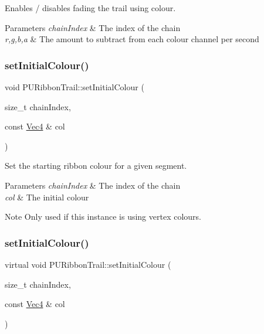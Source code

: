 Enables / disables fading the trail using colour. 
\begin{DoxyParams}{Parameters}
{\em chain\+Index} & The index of the chain \\
\hline
{\em r,g,b,a} & The amount to subtract from each colour channel per second \\
\hline
\end{DoxyParams}
\mbox{\label{classPURibbonTrail_a5a84fe723e163b729896fb5f307fe04b}} 
\subsubsection{\texorpdfstring{set\+Initial\+Colour()}{setInitialColour()}\hspace{0.1cm}{\footnotesize\ttfamily [1/4]}}
{\footnotesize\ttfamily void P\+U\+Ribbon\+Trail\+::set\+Initial\+Colour (\begin{DoxyParamCaption}\item[{size\+\_\+t}]{chain\+Index,  }\item[{const \hyperlink{classVec4}{Vec4} \&}]{col }\end{DoxyParamCaption})\hspace{0.3cm}{\ttfamily [virtual]}}

Set the starting ribbon colour for a given segment. 
\begin{DoxyParams}{Parameters}
{\em chain\+Index} & The index of the chain \\
\hline
{\em col} & The initial colour \\
\hline
\end{DoxyParams}
\begin{DoxyNote}{Note}
Only used if this instance is using vertex colours. 
\end{DoxyNote}
\mbox{\label{classPURibbonTrail_a0edec50ab0e916eeaf1670ee4cf4df15}} 
\subsubsection{\texorpdfstring{set\+Initial\+Colour()}{setInitialColour()}\hspace{0.1cm}{\footnotesize\ttfamily [2/4]}}
{\footnotesize\ttfamily virtual void P\+U\+Ribbon\+Trail\+::set\+Initial\+Colour (\begin{DoxyParamCaption}\item[{size\+\_\+t}]{chain\+Index,  }\item[{const \hyperlink{classVec4}{Vec4} \&}]{col }\end{DoxyParamCaption})\hspace{0.3cm}{\ttfamily [virtual]}}

